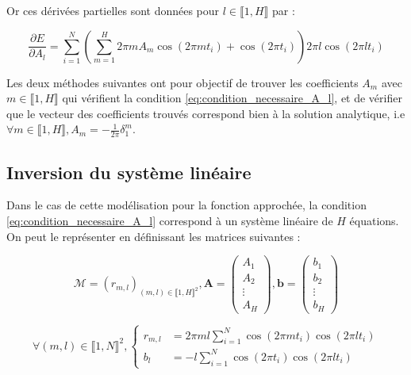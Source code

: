 \documentclass[12pt]{report}
\begin{document}
Or ces dérivées partielles sont données pour $l \in \llbracket 1,H \rrbracket$ par :

\begin{equation}
    \frac{\partial E}{\partial A_l} =
    \sum_{i=1}^{N}(\sum_{m=1}^{H} 2\pi m A_m \cos(2\pi m t_i)+\cos(2\pi t_i))
    2\pi l \cos(2\pi l t_i)
    \label{eq:gradient}
\end{equation}


Les deux méthodes suivantes ont pour objectif de trouver les coefficients $A_m$ avec ${m\in \llbracket 1,H \rrbracket}$ qui vérifient la condition \ref{eq:condition_necessaire_A_l}, et de vérifier que le vecteur des coefficients trouvés correspond bien à la solution analytique, i.e $\forall m \in\llbracket 1,H \rrbracket, A_m = -\frac{1}{2\pi}\delta_1^m$.


\subsection{Inversion du système linéaire}

Dans le cas de cette modélisation pour la fonction approchée, la condition \ref{eq:condition_necessaire_A_l} correspond à un système linéaire de $H$ équations.
On peut le représenter en définissant les matrices suivantes :

\begin{equation}
    \mathcal{M} = (r_{m,l})_{(m,l)\in \llbracket 1, H\rrbracket ^2},
    \bm{A} = \begin{pmatrix}
        A_1    \\
        A_2    \\
        \vdots \\
        A_H
    \end{pmatrix},
    \bm{b} = \begin{pmatrix}
        b_1    \\
        b_2    \\
        \vdots \\
        b_H
    \end{pmatrix}
    \label{eq:definition_notation}
\end{equation}

\begin{equation}
    \forall (m,l) \in \llbracket 1, N\rrbracket ^2,
    \left\{
    \begin{aligned}
        r_{m,l} & = 2\pi ml \sum_{i=1}^{N}\cos(2\pi mt_i)\cos(2\pi lt_i) \\
        b_l     & = -l\sum_{i=1}^{N}\cos(2\pi t_i)\cos(2\pi lt_i)
    \end{aligned}
    \right.
    \label{eq:definition_coefficients}
\end{equation}
\end{document}
